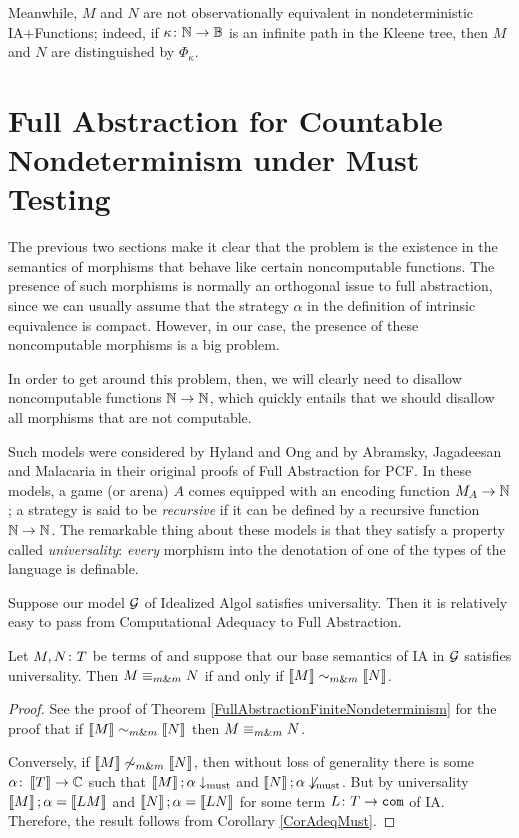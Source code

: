 Meanwhile, $M$ and $N$ are not observationally equivalent in nondeterministic IA+Functions; indeed, if $\kappa\colon \mathbb{N} \to \mathbb{B}$ is an infinite path in the Kleene tree, then $M$ and $N$ are distinguished by $\Phi_\kappa$.

\section{Full Abstraction for Countable Nondeterminism under Must Testing}

The previous two sections make it clear that the problem is the existence in the semantics of morphisms that behave like certain noncomputable functions.  
The presence of such morphisms is normally an orthogonal issue to full abstraction, since we can usually assume that the strategy $\alpha$ in the definition of intrinsic equivalence is compact.
However, in our case, the presence of these noncomputable morphisms is a big problem.

In order to get around this problem, then, we will clearly need to disallow noncomputable functions $\mathbb{N}\to\mathbb{N}$, which quickly entails that we should disallow all morphisms that are not computable.

Such models were considered by Hyland and Ong \cite{hoPcf} and by Abramsky, Jagadeesan and Malacaria \cite{ajmPcf} in their original proofs of Full Abstraction for PCF.
In these models, a game (or arena) $A$ comes equipped with an encoding function $M_A \to \mathbb{N}$; a strategy is said to be \emph{recursive} if it can be defined by a recursive function $\mathbb{N} \to \mathbb{N}$.
The remarkable thing about these models is that they satisfy a property called \emph{universality}: \emph{every} morphism into the denotation of one of the types of the language is definable.

Suppose our model $\mathcal G$ of Idealized Algol satisfies universality.  
Then it is relatively easy to pass from Computational Adequacy to Full Abstraction.

\begin{theorem}
  Let $M,N\colon T$ be terms of \IAX and suppose that our base semantics of IA in $\mathcal G$ satisfies universality.  
  Then $M\mathrel{\equiv_{m\&m}} N$ if and only if $\left\llbracket M\right\rrbracket \mathrel{\sim_{m\&m}} \left\llbracket N\right\rrbracket$.
\end{theorem}
\begin{proof}
  See the proof of Theorem \ref{FullAbstractionFiniteNondeterminism} for the proof that if $\left\llbracket M\right\rrbracket \mathrel{\sim_{m\&m}} \left\llbracket N\right\rrbracket$ then $M\mathrel{\equiv_{m\&m}} N$.  

  Conversely, if $\left\llbracket M\right\rrbracket \not\mathrel{\sim_{m\&m}} \left\llbracket N\right\rrbracket$, then without loss of generality there is some $\alpha\colon\left\llbracket T\right\rrbracket \to \mathbb{C}$ such that $\left\llbracket M\right\rrbracket;\alpha \downarrow_{\operatorname{must}}$ and $\left\llbracket N\right\rrbracket;\alpha\not\downarrow_{\operatorname{must}}$.  
  But by universality $\left\llbracket M\right\rrbracket;\alpha = \left\llbracket LM\right\rrbracket$ and $\left\llbracket N\right\rrbracket;\alpha=\left\llbracket LN\right\rrbracket$ for some term $L\colon T \to {\mathtt{com}}$ of IA.  
  Therefore, the result follows from Corollary \ref{CorAdeqMust}.
\end{proof}

